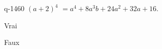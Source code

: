 \begin{truefalse}{q-1460}
$(a+2)^4$ $=a^4+8a^3b+24a^2+32a+16$.
\item* Vrai
\item Faux
\end{truefalse}


